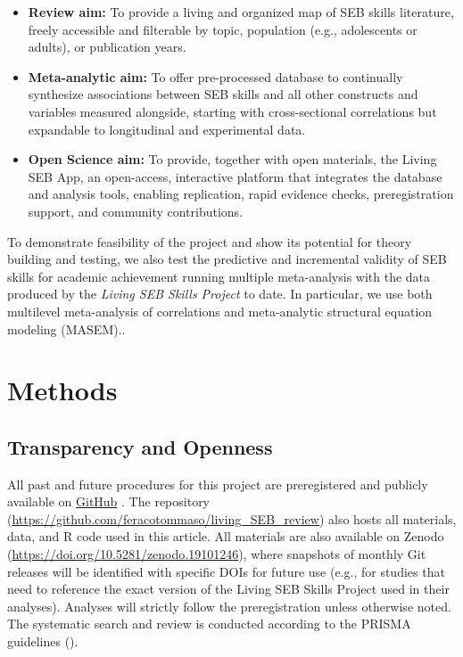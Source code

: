 \documentclass[
  man,
  longtable,
  nolmodern,
  notxfonts,
  notimes,
  colorlinks=true,linkcolor=blue,citecolor=blue,urlcolor=blue]{apa7}
\begin{document}
\begin{itemize}
\item
  \textbf{Review aim:} To provide a living and organized map of SEB
  skills literature, freely accessible and filterable by topic,
  population (e.g., adolescents or adults), or publication years.
\item
  \textbf{Meta-analytic aim:} To offer pre-processed database to
  continually synthesize associations between SEB skills and all other
  constructs and variables measured alongside, starting with
  cross-sectional correlations but expandable to longitudinal and
  experimental data.
\item
  \textbf{Open Science aim:} To provide, together with open materials,
  the Living SEB App, an open-access, interactive platform that
  integrates the database and analysis tools, enabling replication,
  rapid evidence checks, preregistration support, and community
  contributions.
\end{itemize}

To demonstrate feasibility of the project and show its potential for
theory building and testing, we also test the predictive and incremental
validity of SEB skills for academic achievement running multiple
meta-analysis with the data produced by the \emph{Living SEB Skills
Project} to date. In particular, we use both multilevel meta-analysis of
correlations and meta-analytic structural equation modeling (MASEM)..

\section{Methods}\label{methods}

\subsection{Transparency and Openness}\label{transparency-and-openness}

All past and future procedures for this project are preregistered and
publicly available on
\href{https://feracotommaso.github.io/living_SEB_review/preregistration/Preregistration_protocol_livingSEB.pdf}{GitHub}
. The repository
(\url{https://github.com/feracotommaso/living_SEB_review}) also hosts
all materials, data, and R code used in this article. All materials are
also available on Zenodo
(\url{https://doi.org/10.5281/zenodo.19101246}), where snapshots of
monthly Git releases will be identified with specific DOIs for future
use (e.g., for studies that need to reference the exact version of the
Living SEB Skills Project used in their analyses). Analyses will
strictly follow the preregistration unless otherwise noted. The
systematic search and review is conducted according to the PRISMA
guidelines ().
\end{document}

